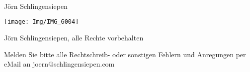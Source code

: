 \thispagestyle{empty}

\onecolumn

\vfill\null

{\Huge
\noindent \coursetitlefirst \\
\\
\noindent \coursetitlesecond \\
}

\vspace{.3cm}

{\Large
\noindent Jörn Schlingensiepen
}

\vspace{4cm}

\vfill\null

\begin{center}
	\texttt{[image: Img/IMG\_6004]}
\end{center}

\vspace{.7cm}

\newpage

\vspace*{\fill}

\noindent\textcopyright Jörn Schlingensiepen, alle Rechte vorbehalten \\

\vspace{.7cm}

\noindent Melden Sie bitte alle Rechtschreib- oder sonstigen Fehlern und Anregungen 
per eMail an joern@schlingensiepen.com

